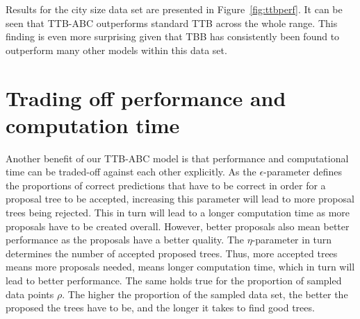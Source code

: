 \documentclass[a4paper,man, natbib]{apa6}
\begin{document}
Results for the city size data set are presented in Figure~\ref{fig:ttbperf}. It can be seen that TTB-ABC outperforms standard TTB across the whole range. This finding is even more surprising given that TBB has consistently been found to outperform many other models within this data set.




\section{Trading off performance and computation time}
Another benefit of our TTB-ABC model is that performance and computational time can be traded-off against each other explicitly. As the $\epsilon$-parameter defines the proportions of correct predictions that have to be correct in order for a proposal tree to be accepted, increasing this parameter will lead to more proposal trees being rejected. This in turn will lead to a longer computation time as more proposals have to be created overall. However, better proposals also mean better performance as the proposals have a better quality. The $\eta$-parameter in turn determines the number of accepted proposed trees. Thus, more accepted trees means more proposals needed, means longer computation time, which in turn will lead to better performance. The same holds true for the proportion of sampled data points $\rho$. The higher the proportion of the sampled data set, the better the proposed the trees have to be, and the longer it takes to find good trees. 
\end{document}
